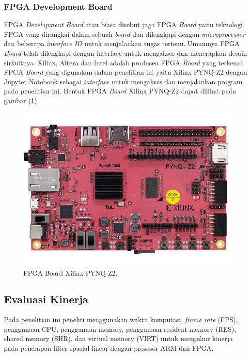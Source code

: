 \subsubsection{FPGA Development Board}
FPGA \textit{Development Board} atau biasa disebut juga FPGA \textit{Board} yaitu teknologi FPGA yang dirangkai dalam sebuah \textit{board} dan dilengkapi dengan \textit{microprocessor} dan beberapa \textit{interface} \textit{IO} untuk menjalankan tugas tertenu. Umumnya FPGA \textit{Board} telah dilengkapi dengan interface untuk mengakses dan menerapkan desain sirkuitnya. Xilinx, Altera dan Intel adalah produsen FPGA \textit{Board} yang terkenal. FPGA \textit{Board} yang digunakan dalam penelitian ini yaitu Xilinx PYNQ-Z2 dengan Jupyter Notebook sebagai \textit{interface} untuk mengakses dan menjalankan program pada penelitian ini. Bentuk FPGA \textit{Board} Xilinx PYNQ-Z2 dapat dilihat pada gambar (\ref{fig:pynq-z2})

\begin{figure}[ht]
    \includegraphics[width=0.8\linewidth, center]{images/pynq-z2.jpeg}
    \caption{FPGA Board Xilinx PYNQ-Z2.}
    \label{fig:pynq-z2}
\end{figure}


\subsection{Evaluasi Kinerja}
Pada penelitian ini peneliti menggunakan waktu komputasi, \textit{frame rate} (FPS), penggunaan CPU, penggunaan {memory}, penggunaan {resident memory} (RES), {shared memory} (SHR), dan {virtual memory} (VIRT) untuk mengukur kinerja pada penerapan filter spasial linear dengan prosesor ARM dan FPGA.

